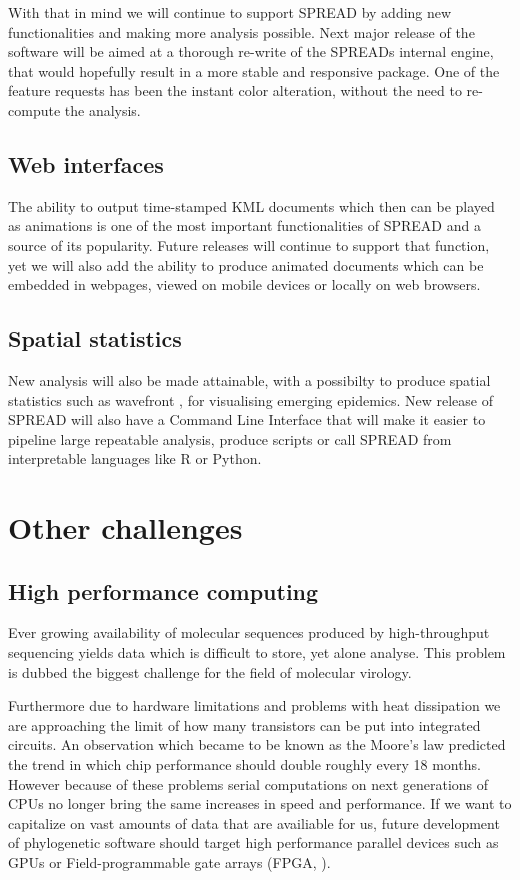 With that in mind we will continue to support SPREAD by adding new functionalities and making more analysis possible.
Next major release of the software will be aimed at a thorough re-write of the SPREADs internal engine, that would hopefully result in a more stable and responsive package.
One of the feature requests has been the instant color alteration, without the need to re-compute the analysis.

\subsection{Web interfaces}

The ability to output time-stamped KML documents which then can be played as animations is one of the most important functionalities of SPREAD and a source of its popularity.
Future releases will continue to support that function, yet we will also add the ability to produce animated documents which can be embedded in webpages, viewed on mobile devices or locally on web browsers.

\subsection{Spatial statistics}

New analysis will also be made attainable, with a possibilty to produce spatial statistics such as wavefront \citep{Pybus2012}, for visualising emerging epidemics.
New release of SPREAD will also have a Command Line Interface that will make it easier to pipeline large repeatable analysis, produce scripts or call SPREAD from interpretable languages like R \citep{RCran} or Python.

\section{Other challenges}

\subsection{High performance computing}

Ever growing availability of molecular sequences produced by high-throughput sequencing yields data which is difficult to store, yet alone analyse.
This problem is dubbed the biggest challenge for the field of molecular virology. %

Furthermore due to hardware limitations and problems with heat dissipation we are approaching the limit of how many transistors can be put into integrated circuits.
An observation which became to be known as the Moore's law predicted the trend in which chip performance should double roughly every 18 months.
However because of these problems serial computations on next generations of CPUs no longer bring the same increases in speed and performance.
If we want to capitalize on vast amounts of data that are availiable for us, future development of phylogenetic software should target high performance parallel devices such as GPUs \citep{Nickolls2008} or Field-programmable gate arrays (FPGA, \citet{Kuon2008}).

